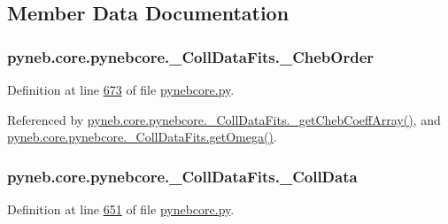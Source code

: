 \subsection{Member Data Documentation}
\hypertarget{classpyneb_1_1core_1_1pynebcore_1_1___coll_data_fits_aeb6a6f312ca21c1e1b3aa72225a0d442}{
\subsubsection[{\-\_\-\-Cheb\-Order}]{\setlength{\rightskip}{0pt plus 5cm}pyneb.\-core.\-pynebcore.\-\_\-\-Coll\-Data\-Fits.\-\_\-\-Cheb\-Order\hspace{0.3cm}{\ttfamily [private]}}}\label{classpyneb_1_1core_1_1pynebcore_1_1___coll_data_fits_aeb6a6f312ca21c1e1b3aa72225a0d442}


Definition at line \hyperlink{pynebcore_8py_source_l00673}{673} of file \hyperlink{pynebcore_8py_source}{pynebcore.\-py}.



Referenced by \hyperlink{pynebcore_8py_source_l00751}{pyneb.\-core.\-pynebcore.\-\_\-\-Coll\-Data\-Fits.\-\_\-get\-Cheb\-Coeff\-Array()}, and \hyperlink{pynebcore_8py_source_l00828}{pyneb.\-core.\-pynebcore.\-\_\-\-Coll\-Data\-Fits.\-get\-Omega()}.

\hypertarget{classpyneb_1_1core_1_1pynebcore_1_1___coll_data_fits_a34f70aba84a783d1a5a8633f797f7bb1}{
\subsubsection[{\-\_\-\-Coll\-Data}]{\setlength{\rightskip}{0pt plus 5cm}pyneb.\-core.\-pynebcore.\-\_\-\-Coll\-Data\-Fits.\-\_\-\-Coll\-Data\hspace{0.3cm}{\ttfamily [private]}}}\label{classpyneb_1_1core_1_1pynebcore_1_1___coll_data_fits_a34f70aba84a783d1a5a8633f797f7bb1}


Definition at line \hyperlink{pynebcore_8py_source_l00651}{651} of file \hyperlink{pynebcore_8py_source}{pynebcore.\-py}.

